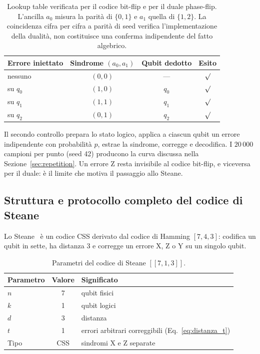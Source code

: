 \begin{onehalfspace}
\begin{table}[H]
\centering
\begin{tabular}{lccc}
\toprule
\textbf{Errore iniettato} & \textbf{Sindrome $(a_0,a_1)$} & \textbf{Qubit dedotto} & \textbf{Esito} \\
\midrule
nessuno & $(0,0)$ & --- & $\surd$ \\
su $q_0$ & $(1,0)$ & $q_0$ & $\surd$ \\
su $q_1$ & $(1,1)$ & $q_1$ & $\surd$ \\
su $q_2$ & $(0,1)$ & $q_2$ & $\surd$ \\
\bottomrule
\end{tabular}
\caption[Verifica della sindrome del codice a ripetizione]{Lookup table
verificata per il codice bit-flip e per il duale phase-flip. L'ancilla
$a_0$ misura la parità di $\{0,1\}$ e $a_1$ quella di $\{1,2\}$. La
coincidenza cifra per cifra a parità di seed verifica l'implementazione
della dualità, non costituisce una conferma indipendente del fatto
algebrico.}
\label{tab:sindrome_repetition}
\end{table}

Il secondo controllo prepara lo stato logico, applica a ciascun qubit un
errore indipendente con probabilità $p$, estrae la sindrome, corregge e
decodifica. I $20\,000$ campioni per punto (seed 42) producono la curva
discussa nella Sezione~\ref{sec:repetition}. Un errore Z resta
invisibile al codice bit-flip, e viceversa per il duale: è il limite che
motiva il passaggio allo Steane.

\subsection{Struttura e protocollo completo del codice di Steane}
\label{app:qec_steane}

Lo Steane~\cite{steane1996} è un codice \ac{CSS} derivato dal codice di
Hamming $[7,4,3]$: codifica un qubit in sette, ha distanza 3 e corregge
un errore X, Z o Y su un singolo qubit.

\begin{table}[H]
\centering
\begin{tabular}{lcl}
\toprule
\textbf{Parametro} & \textbf{Valore} & \textbf{Significato} \\
\midrule
$n$ & 7 & qubit fisici \\
$k$ & 1 & qubit logici \\
$d$ & 3 & distanza \\
$t$ & 1 & errori arbitrari correggibili (Eq.~\ref{eq:distanza_t}) \\
Tipo & \ac{CSS} & sindromi X e Z separate \\
\bottomrule
\end{tabular}
\caption[Parametri del codice di Steane]{Parametri del codice di Steane $[[7,1,3]]$.}
\label{tab:steane_parametri}
\end{table}


\end{onehalfspace}
